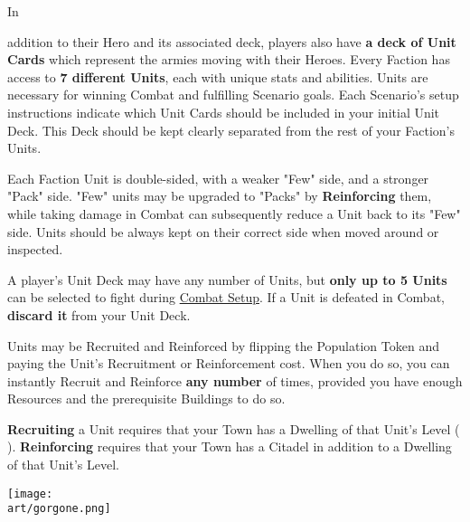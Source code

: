 
\begin{multicols*}{2}

\hypertarget{Units}{In} addition to their Hero and its associated deck, players also have \textbf{a deck of Unit Cards} which represent the armies moving with their Heroes.
Every Faction has access to \textbf{7 different Units}, each with unique stats and abilities.
Units are necessary for winning Combat and fulfilling Scenario goals.
Each Scenario's setup instructions indicate which Unit Cards should be included in your initial Unit Deck.
This Deck should be kept clearly separated from the rest of your Faction's Units.\par
Each Faction Unit is double-sided, with a weaker "Few" side, and a stronger "Pack" side.
"Few" units may be upgraded to "Packs" by \textbf{Reinforcing} them, while taking damage in Combat can subsequently reduce a Unit back to its "Few" side.
Units should be always kept on their correct side when moved around or inspected.\par
A player's Unit Deck may have any number of Units, but \textbf{only up to 5 Units} can be selected to fight during \hyperlink{Combatsetup}{Combat Setup}.
If a Unit is defeated in Combat, \textbf{discard it} from your Unit Deck.\par
Units may be Recruited and Reinforced by flipping the Population Token and paying the Unit's Recruitment  or Reinforcement  cost.
When you do so, you can instantly Recruit and Reinforce \textbf{any number} of times, provided you have enough Resources and the prerequisite Buildings to do so.\par
\textbf{Recruiting} a Unit requires that your Town has a Dwelling of that Unit's Level ( ).
\textbf{Reinforcing} requires that your Town has a Citadel in addition to a Dwelling of that Unit's Level.\par


\vspace*{\fill}
  \hspace{1em}
\texttt{[image: \\art/gorgone.png]}

\clearpage

\end{multicols*}
